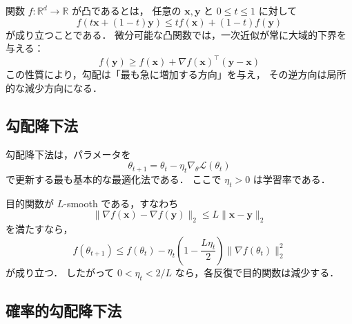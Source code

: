 関数 $f:\mathbb{R}^{d}\to\mathbb{R}$ が凸であるとは，
任意の $\boldsymbol{x},\boldsymbol{y}$ と $0\leq t\leq 1$ に対して
\begin{equation}
  f(t\boldsymbol{x} + (1-t)\boldsymbol{y})
  \leq
  tf(\boldsymbol{x}) + (1-t)f(\boldsymbol{y})
  \label{eq:convexity}
\end{equation}
が成り立つことである\cite{Boyd2004}．
微分可能な凸関数では，一次近似が常に大域的下界を与える：
\begin{equation}
  f(\boldsymbol{y})
  \geq
  f(\boldsymbol{x})
  +
  \nabla f(\boldsymbol{x})^{\top}
  (\boldsymbol{y}-\boldsymbol{x})
  \label{eq:first-order-convex}
\end{equation}
この性質により，勾配は「最も急に増加する方向」を与え，
その逆方向は局所的な減少方向になる．

\subsection{勾配降下法}

勾配降下法は，パラメータを
\begin{equation}
  \theta_{t+1}
  =
  \theta_{t} - \eta_{t}\nabla_{\theta} \mathcal{L}(\theta_{t})
  \label{eq:gradient-descent}
\end{equation}
で更新する最も基本的な最適化法である．
ここで $\eta_{t}>0$ は学習率である．

目的関数が $L$-smooth である，すなわち
\begin{equation}
  \|\nabla f(\boldsymbol{x})-\nabla f(\boldsymbol{y})\|_{2}
  \leq
  L\|\boldsymbol{x}-\boldsymbol{y}\|_{2}
  \label{eq:l-smooth}
\end{equation}
を満たすなら，
\begin{equation}
  f(\theta_{t+1})
  \leq
  f(\theta_{t})
  -
  \eta_{t}
  \left(
    1-\frac{L\eta_{t}}{2}
  \right)
  \|\nabla f(\theta_{t})\|_{2}^{2}
  \label{eq:descent-lemma}
\end{equation}
が成り立つ．
したがって $0 < \eta_{t} < 2/L$ なら，各反復で目的関数は減少する．

\subsection{確率的勾配降下法}

